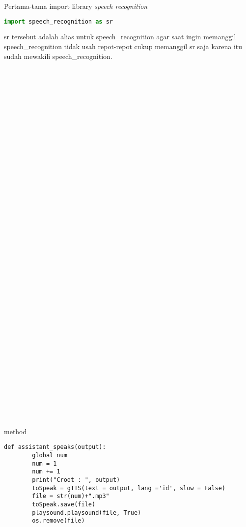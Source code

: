 \par Pertama-tama import library \textit{speech recognition}
\begin{lstlisting}[language=Python]
import speech_recognition as sr 
\end{lstlisting}
\par sr tersebut adalah alias untuk speech\_recognition agar saat ingin memanggil\\ speech\_recognition tidak usah repot-repot cukup memanggil sr saja karena itu sudah mewakili speech\_recognition.
\\
\\
\\
\\
\\
\\
\\
\\
\\
\\
\\
\\
\\
\\
\\
\\
\\
\\
\\
\\
\\
\\
\\
\\
\\
\\
\\
\\
\\
\\
\\
\\
\\
\\
\\
\\
\\
\\
\\
method
\begin{lstlisting}
def assistant_speaks(output): 
        global num 
        num = 1
        num += 1
        print("Croot : ", output) 
        toSpeak = gTTS(text = output, lang ='id', slow = False) 
        file = str(num)+".mp3"  
        toSpeak.save(file) 
        playsound.playsound(file, True) 
        os.remove(file) 
\end{lstlisting}
